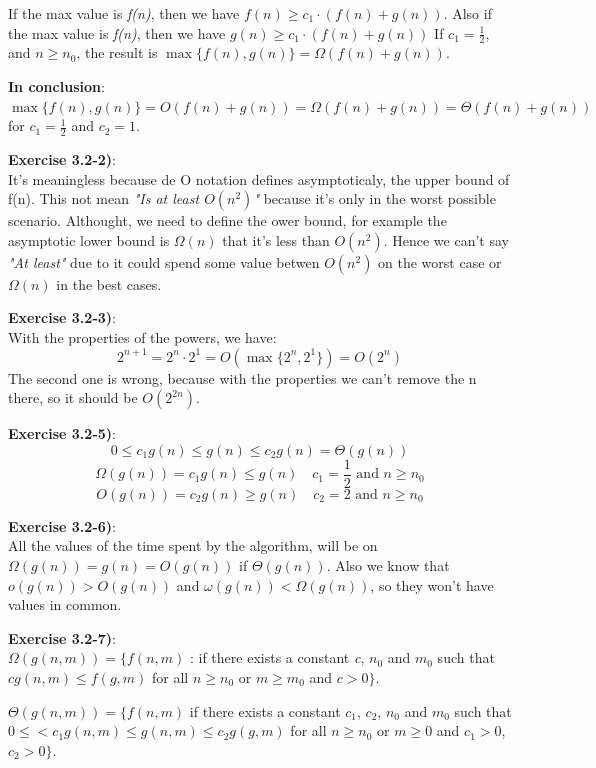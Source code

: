 \documentclass{article}
\newcounter{exercise}[section]   %
\begin{document}
If the max value is \textit{f(n)}, then we have \(f(n) \geq c_1 \cdot (f(n) + g(n))\).
Also if the max value is \textit{f(n)}, then we have \(g(n) \geq c_1 \cdot (f(n) + g(n))\)
If \(c_1 = \frac{1}{2}\), and \(n \geq n_0\), the result is \(\max \{f(n), g(n)\} = \Omega
(f(n) + g(n))\).

\textbf{In conclusion}: \(\max \{f(n), g(n)\} = O(f(n) + g(n)) = \Omega(f(n) + g(n)) =
\Theta(f(n) + g(n))\) for \(c_1 = \frac{1}{2}\) and \(c_2 = 1\).

\textbf{Exercise 3.2-2)}:\\
It's meaningless because de O notation defines asymptoticaly, the upper bound of f(n). This 
not mean \textit{"Is at least \(O(n^2)\)"} because it's only in the worst possible scenario.
Althought, we need to define the ower bound, for example the asymptotic lower bound is 
\(\Omega(n)\) that it's less than \(O(n^2)\). Hence we can't say \textit{"At least"} due to
it could spend some value betwen \(O(n^2)\) on the worst case or \(\Omega(n)\) in the best
cases.

\textbf{Exercise 3.2-3)}:\\
With the properties of the powers, we have: 
\[
2^{n + 1} = 2^n \cdot 2^1 = O(\max\{2^n, 2^1\}) = O(2^n)
\]
The second one is wrong, because with the properties we can't remove the n there, so it
should be \(O(2^{2n})\).

\textbf{Exercise 3.2-5)}:
\[
0 \leq c_1g(n) \leq g(n) \leq c_2g(n) = \Theta(g(n)) 
\]
\[
\Omega(g(n)) = c_1g(n) \leq g(n) \quad c_1 = \frac{1}{2} \text{ and } n \geq n_0
\]
\[
O(g(n)) = c_2g(n) \geq g(n) \quad c_2 = 2 \text{ and } n \geq n_0
\]

\textbf{Exercise 3.2-6)}:\\
All the values of the time spent by the algorithm, will be on \(\Omega(g(n)) = g(n)
= O(g(n))\) if \(\Theta(g(n))\). Also we know that \(o(g(n)) > O(g(n))\) and 
\(\omega(g(n)) < \Omega(g(n))\), so they won't have values in common.

\textbf{Exercise 3.2-7)}:\\
\(\Omega(g(n, m)) = \{ f(n, m)\) : if there exists a constant \textit{c}, \(n_0\) and \(m_0\) 
such that \(cg(n, m) \leq f(g, m)\) for all \( n \geq n_0\) or \(m \geq m_0\) and \(c > 0 \}\).

\(\Theta(g(n, m)) = \{ f(n, m)\) if there exists a constant \(c_1\), \(c_2\), \(n_0\) and 
\(m_0\) such that \(0 \leq < c_1g(n, m) \leq g(n, m) \leq c_2g(g, m)\) for all \(n \geq n_0\)
or \(m \geq 0\) and \(c_1 > 0\), \(c_2 > 0 \}\).
\end{document}
